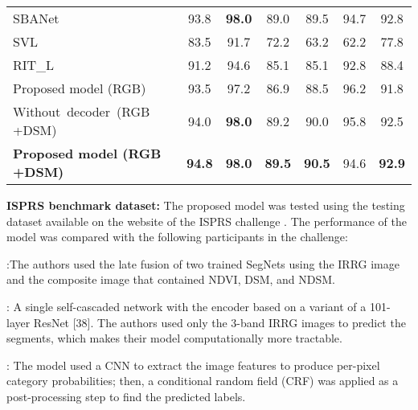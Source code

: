 \documentclass[journal]{IEEEtran}
\begin{document}
\begin{table*}[h!]
\begin{tabular}{lcccccc}
SBANet \cite{9345482}                       & 93.8                   & \textbf{98.0}      & 89.0                 & 89.5       & 94.7          & 92.8                                           \\
SVL \cite{rs10091429}                 & 83.5                   & 91.7               & 72.2                 & 63.2            & 62.2   & 77.8                                             \\
RIT\_L \cite{10.1117/12.2243169}                         & 91.2                     & 94.6                 & 85.1                  & 85.1             & 92.8           & 88.4                                             \\

Proposed model (RGB)            & 93.5                    & 97.2              & 86.9                  & 88.5             & 96.2          & 91.8                                           \\
Without~decoder~(RGB +DSM)       & 94.0                     & \textbf{98.0}        & 89.2                   & 90.0             & 95.8            & 92.5                                             \\
\textbf{Proposed model (RGB +DSM)} & \textbf{94.8}           & \textbf{98.0}        & \textbf{89.5}          & \textbf{90.5}    & 94.6           & \textbf{92.9}                           \\
\hline
\end{tabular}
\label{table:4}
\end{table*}
\textbf{ISPRS benchmark dataset:} The proposed model was tested using the testing dataset available on the website of the ISPRS challenge \cite{labeling_2016}. The performance of the model was compared with the following participants in the challenge:

 \cite{AUDEBERT201820}:The authors used the late fusion of two trained SegNets using the IRRG image and the composite image that contained NDVI, DSM, and NDSM.

 \cite{LIU201878}: A single self-cascaded network with the encoder based on a variant of a 101-layer ResNet [38]. The authors used only the 3-band IRRG images to predict the segments, which makes their model computationally more tractable. 

 \cite{Peng_2017_CVPR} : The model used a CNN to extract the image features to produce per-pixel category probabilities; then, a conditional random field (CRF) was applied as a post-processing step to find the predicted labels.
\end{document}
